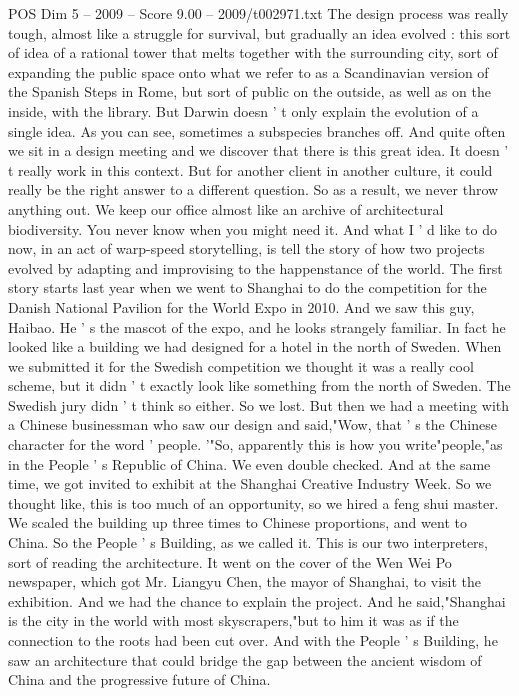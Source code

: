 \begin{textsample}{POS Dim 5 – 2009 – Score 9.00 – 2009/t002971.txt}
The design process was really tough, almost like a struggle for survival, but gradually an idea evolved : this sort of idea of a rational tower that melts together with the surrounding city, sort of expanding the public space onto what we refer to as a Scandinavian version of the Spanish Steps in Rome, but sort of public on the outside, as well as on the inside, with the library.
But Darwin doesn ' t only explain the evolution of a single idea.
As you can see, sometimes a subspecies branches off.
And quite often we sit in a design meeting and we discover that there is this great idea.
It doesn ' t really work in this context.
But for another client in another culture, it could really be the right answer to a different question.
So as a result, we never throw anything out.
We keep our office almost like an archive of architectural biodiversity.
You never know when you might need it.
And what I ' d like to do now, in an act of warp-speed storytelling, is tell the story of how two projects evolved by adapting and improvising to the happenstance of the world.
The first story starts last year when we went to Shanghai to do the competition for the Danish National Pavilion for the World Expo in 2010.
And we saw this guy, Haibao.
He ' s the mascot of the expo, and he looks strangely familiar.
In fact he looked like a building we had designed for a hotel in the north of Sweden.
When we submitted it for the Swedish competition we thought it was a really cool scheme, but it didn ' t exactly look like something from the north of Sweden.
The Swedish jury didn ' t think so either.
So we lost.
But then we had a meeting with a Chinese businessman who saw our design and said,"Wow, that ' s the Chinese character for the word ' people. '"So, apparently this is how you write"people,"as in the People ' s Republic of China.
We even double checked.
And at the same time, we got invited to exhibit at the Shanghai Creative Industry Week.
So we thought like, this is too much of an opportunity, so we hired a feng shui master.
We scaled the building up three times to Chinese proportions, and went to China.
So the People ' s Building, as we called it.
This is our two interpreters, sort of reading the architecture.
It went on the cover of the Wen Wei Po newspaper, which got Mr.
Liangyu Chen, the mayor of Shanghai, to visit the exhibition.
And we had the chance to explain the project.
And he said,"Shanghai is the city in the world with most skyscrapers,"but to him it was as if the connection to the roots had been cut over.
And with the People ' s Building, he saw an architecture that could bridge the gap between the ancient wisdom of China and the progressive future of China.

\end{textsample}
